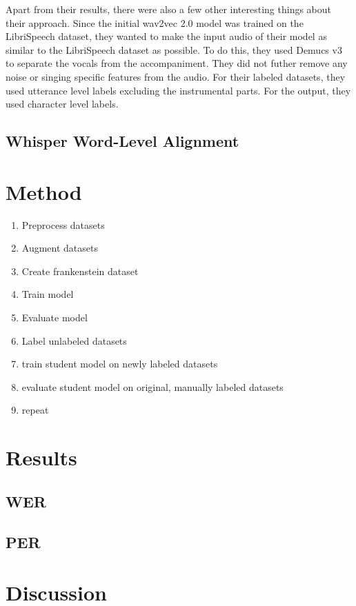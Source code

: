 \documentclass[letterpaper, 12pt]{article}
\begin{document}
\begin{multicols*}{2}
Apart from their results, there were also a few other interesting things about their approach. Since
the initial wav2vec 2.0 model was trained on the LibriSpeech dataset, they wanted to make the input
audio of their model as similar to the LibriSpeech dataset as possible. To do this, they used
Demucs v3 \citep{Demucs} to separate the vocals from the accompaniment. They did not futher remove any
noise or singing specific features from the audio. For their labeled datasets, they used
utterance level labels excluding the instrumental parts. For the output, they used character level
labels.

\subsection{Whisper Word-Level Alignment}



\section{Method}
\begin{enumerate}
    \item Preprocess datasets
    \item Augment datasets
    \item Create frankenstein dataset
    \item Train model
    \item Evaluate model
    \item Label unlabeled datasets
    \item train student model on newly labeled datasets
    \item evaluate student model on original, manually labeled datasets
    \item repeat
\end{enumerate}

\section{Results}

\subsection{WER}

\subsection{PER}

\section{Discussion}


\end{multicols*}
\end{document}
